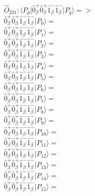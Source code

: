\documentclass[14pt]{article}
\begin{document}
    $\hat{O}_{231}:  \langle{P_p}\vert \hat{0}_{\beta}^{+}\hat{0}_{\beta}^{+}\hat{1}_{\beta}^{-}\hat{1}_{\beta}^{-} \vert{P_q}\rangle => $ \\ 
    $ \hat{0}_{\beta}^{+}\hat{0}_{\beta}^{+}\hat{1}_{\beta}^{-}\hat{1}_{\beta}^{-} \vert{P_{0}}\rangle =  $ \\ 
    $ \hat{0}_{\beta}^{+}\hat{0}_{\beta}^{+}\hat{1}_{\beta}^{-}\hat{1}_{\beta}^{-} \vert{P_{1}}\rangle =  $ \\ 
    $ \hat{0}_{\beta}^{+}\hat{0}_{\beta}^{+}\hat{1}_{\beta}^{-}\hat{1}_{\beta}^{-} \vert{P_{2}}\rangle =  $ \\ 
    $ \hat{0}_{\beta}^{+}\hat{0}_{\beta}^{+}\hat{1}_{\beta}^{-}\hat{1}_{\beta}^{-} \vert{P_{3}}\rangle =  $ \\ 
    $ \hat{0}_{\beta}^{+}\hat{0}_{\beta}^{+}\hat{1}_{\beta}^{-}\hat{1}_{\beta}^{-} \vert{P_{4}}\rangle =  $ \\ 
    $ \hat{0}_{\beta}^{+}\hat{0}_{\beta}^{+}\hat{1}_{\beta}^{-}\hat{1}_{\beta}^{-} \vert{P_{5}}\rangle =  $ \\ 
    $ \hat{0}_{\beta}^{+}\hat{0}_{\beta}^{+}\hat{1}_{\beta}^{-}\hat{1}_{\beta}^{-} \vert{P_{6}}\rangle =  $ \\ 
    $ \hat{0}_{\beta}^{+}\hat{0}_{\beta}^{+}\hat{1}_{\beta}^{-}\hat{1}_{\beta}^{-} \vert{P_{7}}\rangle =  $ \\ 
    $ \hat{0}_{\beta}^{+}\hat{0}_{\beta}^{+}\hat{1}_{\beta}^{-}\hat{1}_{\beta}^{-} \vert{P_{8}}\rangle =  $ \\ 
    $ \hat{0}_{\beta}^{+}\hat{0}_{\beta}^{+}\hat{1}_{\beta}^{-}\hat{1}_{\beta}^{-} \vert{P_{9}}\rangle =  $ \\ 
    $ \hat{0}_{\beta}^{+}\hat{0}_{\beta}^{+}\hat{1}_{\beta}^{-}\hat{1}_{\beta}^{-} \vert{P_{10}}\rangle =  $ \\ 
    $ \hat{0}_{\beta}^{+}\hat{0}_{\beta}^{+}\hat{1}_{\beta}^{-}\hat{1}_{\beta}^{-} \vert{P_{11}}\rangle =  $ \\ 
    $ \hat{0}_{\beta}^{+}\hat{0}_{\beta}^{+}\hat{1}_{\beta}^{-}\hat{1}_{\beta}^{-} \vert{P_{12}}\rangle =  $ \\ 
    $ \hat{0}_{\beta}^{+}\hat{0}_{\beta}^{+}\hat{1}_{\beta}^{-}\hat{1}_{\beta}^{-} \vert{P_{13}}\rangle =  $ \\ 
    $ \hat{0}_{\beta}^{+}\hat{0}_{\beta}^{+}\hat{1}_{\beta}^{-}\hat{1}_{\beta}^{-} \vert{P_{14}}\rangle =  $ \\ 
    $ \hat{0}_{\beta}^{+}\hat{0}_{\beta}^{+}\hat{1}_{\beta}^{-}\hat{1}_{\beta}^{-} \vert{P_{15}}\rangle =  $ \\ 
    
\end{document}

